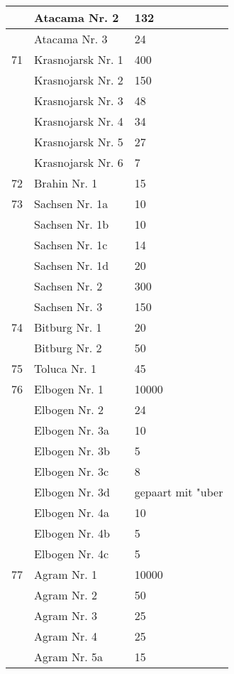 \documentclass[a4paper, 11pt, oneside, polutonikogreek, german]{article}
\begin{document}
\begin{center}
\begin{longtable}{|l|l|l|}
          & Atacama Nr. 2 & 132 \\ \hline
          & Atacama Nr. 3 & 24 \\ \hline
        71 & Krasnojarsk Nr. 1 & 400 \\ \hline
          & Krasnojarsk Nr. 2 & 150 \\ \hline
          & Krasnojarsk Nr. 3 & 48 \\ \hline
          & Krasnojarsk Nr. 4 & 34 \\ \hline
          & Krasnojarsk Nr. 5 & 27 \\ \hline
          & Krasnojarsk Nr. 6 & 7 \\ \hline
        72 & Brahin Nr. 1 & 15 \\ \hline
        73 & Sachsen Nr. 1a & 10 \\ \hline
          & Sachsen Nr. 1b & 10 \\ \hline
          & Sachsen Nr. 1c & 14 \\ \hline
          & Sachsen Nr. 1d & 20 \\ \hline
          & Sachsen Nr. 2 & 300 \\ \hline
          & Sachsen Nr. 3 & 150 \\ \hline
        74 & Bitburg Nr. 1 & 20 \\ \hline
          & Bitburg Nr. 2 & 50 \\ \hline
        75 & Toluca Nr. 1 & 45 \\ \hline
        76 & Elbogen Nr. 1 & 10000 \\ \hline
          & Elbogen Nr. 2 & 24 \\ \hline
          & Elbogen Nr. 3a & 10 \\ \hline
          & Elbogen Nr. 3b & 5 \\ \hline
          & Elbogen Nr. 3c & 8 \\ \hline
          & Elbogen Nr. 3d & gepaart mit "uber \\ \hline
          & Elbogen Nr. 4a & 10 \\ \hline
          & Elbogen Nr. 4b & 5 \\ \hline
          & Elbogen Nr. 4c & 5 \\ \hline
        77 & Agram Nr. 1 & 10000 \\ \hline
          & Agram Nr. 2 & 50 \\ \hline
          & Agram Nr. 3 & 25 \\ \hline
          & Agram Nr. 4 & 25 \\ \hline
          & Agram Nr. 5a & 15 \\ \hline

\end{longtable}
\end{center}
\end{document}
